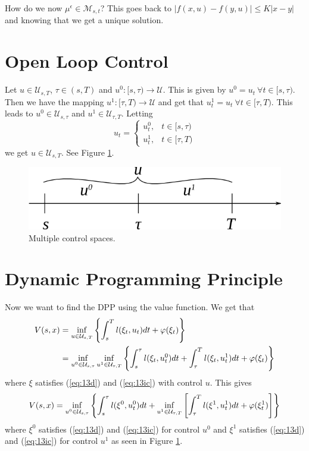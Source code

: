 How do we now $\mu^\epsilon\in\mathcal{M}_{s,t}$? This goes back to $|f(x,u)-f(y,u)|\leq K|x-y|$ and knowing that we get a unique solution.

\section{Open Loop Control}
Let $u\in\mathcal{U}_{s,T}$, $\tau\in(s,T)$ and $u^0:[s,\tau)\to\mathcal{U}$. This is given by $u^0=u_t ~\forall t\in[s,\tau)$. Then we have the mapping $u^1: [\tau,T)\to\mathcal{U}$ and get that $u^1_t=u_t ~\forall t\in[\tau,T)$. This leads to $u^0\in\mathcal{U}_{s,\tau}$ and $u^1\in\mathcal{U}_{\tau,T}$. Letting
$$u_t=\begin{cases} u_t^0, & t\in[s,\tau) \\ u_t^1, & t\in[\tau,T) \end{cases}$$
we get $u\in\mathcal{U}_{s,T}$. See Figure \ref{fig:13controlspace}.

\begin{figure}[ht!]
	\centering
	\includegraphics[width=.5\textwidth]{images/13controlspace}
	\caption{Multiple control spaces.}
	\label{fig:13controlspace}
\end{figure}

\section{Dynamic Programming Principle}
Now we want to find the DPP using the value function. We get that
\begin{align*}
V(s,x) &= \inf_{u\in\mathcal{U}_{s,T}} \left\lbrace \int_s^T l(\xi_t,u_t)dt + \varphi(\xi_t) \right\rbrace \\
&= \inf_{u^0\in\mathcal{U}_{s,\tau}} \inf_{u^1\in\mathcal{U}_{\tau,T}} \left\lbrace \int_s^\tau l(\xi_t,u_t^0)dt + \int_\tau^T l(\xi_t,u_t^1)dt + \varphi(\xi_t) \right\rbrace
\end{align*}
where $\xi$ satisfies (\ref{eq:13d}) and (\ref{eq:13ic}) with control $u$. This gives
\begin{align*}
V(s,x) = \inf_{u^0\in\mathcal{U}_{s,\tau}} \left\lbrace \int_s^\tau l(\xi^0,u_t^0)dt + \inf_{u^1\in\mathcal{U}_{\tau,T}} \left[\int_\tau^T l(\xi^1,u_t^1)dt + \varphi(\xi_t^1)\right]\right\rbrace
\end{align*}
where $\xi^0$ satisfies (\ref{eq:13d}) and (\ref{eq:13ic}) for control $u^0$ and $\xi^1$ satisfies (\ref{eq:13d}) and (\ref{eq:13ic}) for control $u^1$ as seen in Figure \ref{fig:13controlspace}.

